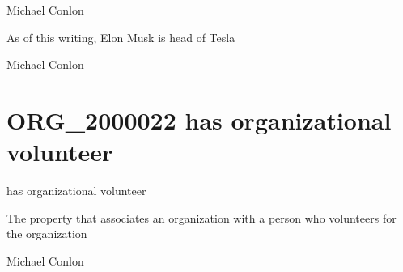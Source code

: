 \documentclass[letterpaper,10pt,english]{sphinxmanual}
\begin{document}
\begin{sphinxShadowBox}

\sphinxAtStartPar
Michael Conlon 
\end{sphinxShadowBox}

\begin{sphinxShadowBox}

\sphinxAtStartPar
As of this writing, Elon Musk is head of Tesla
\end{sphinxShadowBox}

\begin{sphinxShadowBox}

\sphinxAtStartPar
Michael Conlon 
\end{sphinxShadowBox}
\begin{quote}
\label{\detokenize{doc-ORG_2000022:org-2000022}}\label{\detokenize{doc-ORG_2000022:has-organizational-volunteer}}\label{\detokenize{doc-ORG_2000022:org-2000022}}
\ignorespaces \end{quote}


\section{ORG\_2000022 \sphinxhyphen{} has organizational volunteer}
\label{\detokenize{doc-ORG_2000022:org-2000022-has-organizational-volunteer}}\label{\detokenize{doc-ORG_2000022:index-0}}\label{\detokenize{doc-ORG_2000022::doc}}
\begin{sphinxShadowBox}

\sphinxAtStartPar
has organizational volunteer
\end{sphinxShadowBox}

\begin{sphinxShadowBox}

\sphinxAtStartPar
The property that associates an organization with a person who volunteers for the organization
\end{sphinxShadowBox}

\begin{sphinxShadowBox}

\sphinxAtStartPar
Michael Conlon 
\end{sphinxShadowBox}
\end{document}
